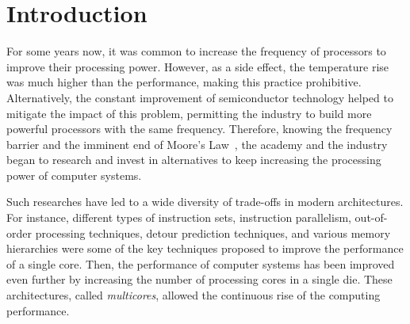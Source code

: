 \chapter{Introduction}
\label{ch.intro}

    For some years now, it was common to increase the frequency of processors to improve their processing power.
    However, as a side effect, the temperature rise was much higher than the performance, making this practice prohibitive.
    Alternatively, the constant improvement of semiconductor technology helped to mitigate the impact of this problem, permitting the industry to build more powerful processors with the same frequency.
    Therefore, knowing the frequency barrier and the imminent end of Moore's Law~\cite{moore:1965}, the academy and the industry began to research and invest in alternatives to keep increasing the processing power of computer systems.

    Such researches have led to a wide diversity of trade-offs in modern architectures.
    For instance, different types of instruction sets, instruction parallelism, out-of-order processing techniques, detour prediction techniques, and various memory hierarchies were some of the key techniques proposed to improve the performance of a single core.
    Then, the performance of computer systems has been improved even further by increasing the number of processing cores in a single die.
    These architectures, called \textit{multicores}, allowed the continuous rise of the computing performance.

